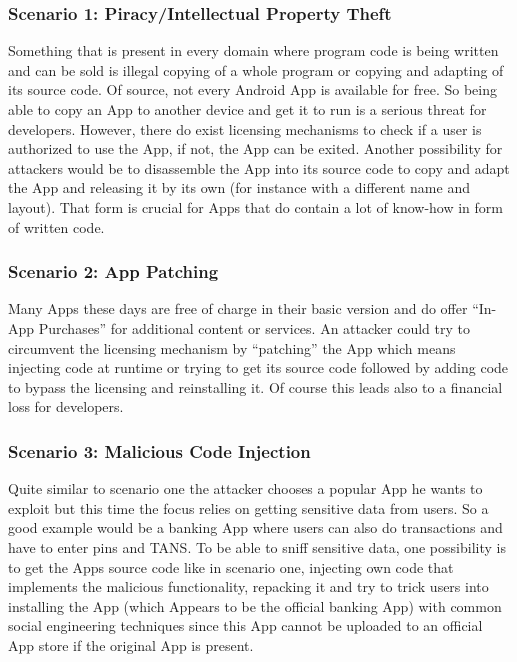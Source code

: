 \subsubsection*{Scenario 1: Piracy/Intellectual Property Theft}\label{section:scenario_1}
Something that is present in every domain where program code is being written
and can be sold is illegal copying of a whole program or copying and adapting of
its source code. Of source, not every Android App is available for free. So being
able to copy an App to another device and get it to run is a serious threat for developers. However, there do exist licensing mechanisms to check if a user is 
authorized to use the App, if not, the App can be exited.
Another possibility for attackers would be to disassemble
the App into its source code to copy and adapt the App and releasing it by its own
(for instance with a different name and layout).
That form is crucial for Apps that do contain a lot of know-how in form of written code.



\subsubsection*{Scenario 2: App Patching}\label{section:scenario_2}
Many Apps these days are free of charge in their basic version and
do offer ``In-App Purchases'' for additional content or services.
An attacker could try to circumvent the licensing mechanism 
by ``patching'' the App which means injecting code at runtime or trying to get its source
code followed by adding code to bypass the licensing and reinstalling it. Of course this
leads also to a financial loss for developers. 

\subsubsection*{Scenario 3: Malicious Code Injection}\label{section:scenario_3}
Quite similar to scenario one the attacker chooses a popular App he wants to exploit 
but this time the focus relies on getting sensitive data from users. So a good example
would be a banking App where users can also do transactions and have to enter pins and TANS. To be able to sniff sensitive data, one possibility is to get the Apps source code
like in scenario one, injecting own code that implements the malicious functionality, repacking it and try to trick users into installing the App (which Appears to be the
official banking App) with common social engineering techniques since this App cannot be
uploaded to an official App store if the original App is present. 


